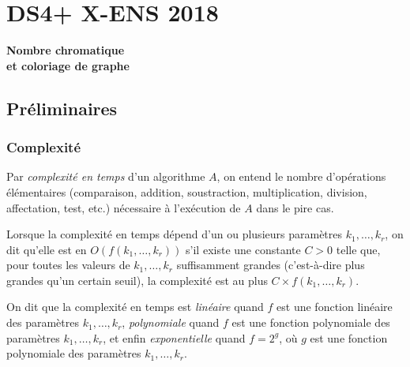 \chapter{DS4+ X-ENS 2018}
\vskip -2cm
\begin{center}
    \Huge \bf Nombre chromatique \\et coloriage de graphe
\end{center}
\section*{Préliminaires}
\subsection*{Complexité}
Par \emph{complexité en temps} d'un algorithme $A$, on entend le nombre d'opérations élémentaires  (comparaison, addition, soustraction, multiplication, division, affectation, test, etc.) nécessaire à l'exécution de $A$ dans le pire cas. 

Lorsque la complexité en temps dépend d'un ou plusieurs paramètres $k_1, \dots, k_r$, on dit qu'elle est en $O(f(k_1,\dots,k_r))$ s'il existe une constante $C > 0$ telle que, pour toutes les valeurs de $k_1,\dots, k_r$ suffisamment grandes (c'est-à-dire plus grandes qu'un certain seuil), la complexité est au plus $C\times f(k_1,\dots,k_r)$.

On dit que la complexité en temps est \emph{linéaire} quand $f$ est une fonction linéaire des paramètres $k_1, \dots, k_r$, \emph{polynomiale} quand $f$ est une fonction polynomiale des paramètres $k_1, \dots, k_r$, et enfin \emph{exponentielle} quand $f = 2^g$, où $g$ est une fonction polynomiale des paramètres $k_1,\dots,k_r$.

